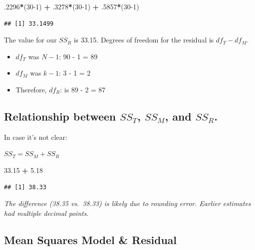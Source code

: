 \documentclass[
  english,
]{book}
\newenvironment{Shaded}{\begin{snugshade}}{\end{snugshade}}
\newcommand{\DecValTok}[1]{\textcolor[rgb]{0.00,0.00,0.81}{#1}}
\newcommand{\FloatTok}[1]{\textcolor[rgb]{0.00,0.00,0.81}{#1}}
\newcommand{\NormalTok}[1]{#1}
\newcommand{\OperatorTok}[1]{\textcolor[rgb]{0.81,0.36,0.00}{\textbf{#1}}}
\newcommand{\StringTok}[1]{\textcolor[rgb]{0.31,0.60,0.02}{#1}}
\providecommand{\tightlist}{%
  \setlength{\itemsep}{0pt}\setlength{\parskip}{0pt}}
\begin{document}
\begin{Shaded}
\begin{Highlighting}[]
\FloatTok{.2296}\OperatorTok{*}\NormalTok{(}\DecValTok{30-1}\NormalTok{) }\OperatorTok{+}\StringTok{ }\FloatTok{.3278}\OperatorTok{*}\NormalTok{(}\DecValTok{30-1}\NormalTok{) }\OperatorTok{+}\StringTok{ }\FloatTok{.5857}\OperatorTok{*}\NormalTok{(}\DecValTok{30-1}\NormalTok{)}
\end{Highlighting}
\end{Shaded}

\begin{verbatim}
## [1] 33.1499
\end{verbatim}

The value for our \(SS_R\) is 33.15. Degrees of freedom for the residual is \(df_T - df_M\).

\begin{itemize}
\tightlist
\item
  \(df_T\) was \(N-1\): 90 - 1 = 89
\item
  \(df_M\) was \(k - 1\): 3 - 1 = 2
\item
  Therefore, \(df_R\): is 89 - 2 = 87
\end{itemize}

\hypertarget{relationship-between-ss_t-ss_m-and-ss_r.}{%
\subsection{\texorpdfstring{Relationship between \(SS_T\), \(SS_M\), and \(SS_R\).}{Relationship between SS\_T, SS\_M, and SS\_R.}}\label{relationship-between-ss_t-ss_m-and-ss_r.}}

In case it's not clear:

\(SS_T = SS_M + SS_R\)

\begin{Shaded}
\begin{Highlighting}[]
\FloatTok{33.15} \OperatorTok{+}\StringTok{ }\FloatTok{5.18}
\end{Highlighting}
\end{Shaded}

\begin{verbatim}
## [1] 38.33
\end{verbatim}

\emph{The difference (38.35 vs.~38.33) is likely due to rounding error. Earlier estimates had multiple decimal points.}

\hypertarget{mean-squares-model-residual}{%
\subsection{Mean Squares Model \& Residual}\label{mean-squares-model-residual}}
\end{document}

